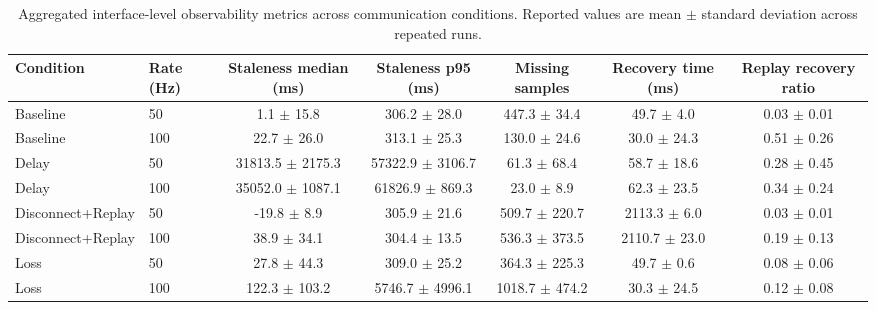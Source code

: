 \begin{table}[t]
\centering
\caption{Aggregated interface-level observability metrics across communication conditions. Reported values are mean $\pm$ standard deviation across repeated runs.}
\label{tab:results_main_full}
\small
\begin{tabular}{llccccc}
\hline
Condition & Rate (Hz) & Staleness median (ms) & Staleness p95 (ms) & Missing samples & Recovery time (ms) & Replay recovery ratio \\
\hline
Baseline & 50 & 1.1 $\pm$ 15.8 & 306.2 $\pm$ 28.0 & 447.3 $\pm$ 34.4 & 49.7 $\pm$ 4.0 & 0.03 $\pm$ 0.01 \\
Baseline & 100 & 22.7 $\pm$ 26.0 & 313.1 $\pm$ 25.3 & 130.0 $\pm$ 24.6 & 30.0 $\pm$ 24.3 & 0.51 $\pm$ 0.26 \\
Delay & 50 & 31813.5 $\pm$ 2175.3 & 57322.9 $\pm$ 3106.7 & 61.3 $\pm$ 68.4 & 58.7 $\pm$ 18.6 & 0.28 $\pm$ 0.45 \\
Delay & 100 & 35052.0 $\pm$ 1087.1 & 61826.9 $\pm$ 869.3 & 23.0 $\pm$ 8.9 & 62.3 $\pm$ 23.5 & 0.34 $\pm$ 0.24 \\
Disconnect+Replay & 50 & -19.8 $\pm$ 8.9 & 305.9 $\pm$ 21.6 & 509.7 $\pm$ 220.7 & 2113.3 $\pm$ 6.0 & 0.03 $\pm$ 0.01 \\
Disconnect+Replay & 100 & 38.9 $\pm$ 34.1 & 304.4 $\pm$ 13.5 & 536.3 $\pm$ 373.5 & 2110.7 $\pm$ 23.0 & 0.19 $\pm$ 0.13 \\
Loss & 50 & 27.8 $\pm$ 44.3 & 309.0 $\pm$ 25.2 & 364.3 $\pm$ 225.3 & 49.7 $\pm$ 0.6 & 0.08 $\pm$ 0.06 \\
Loss & 100 & 122.3 $\pm$ 103.2 & 5746.7 $\pm$ 4996.1 & 1018.7 $\pm$ 474.2 & 30.3 $\pm$ 24.5 & 0.12 $\pm$ 0.08 \\
\hline
\end{tabular}
\end{table}
